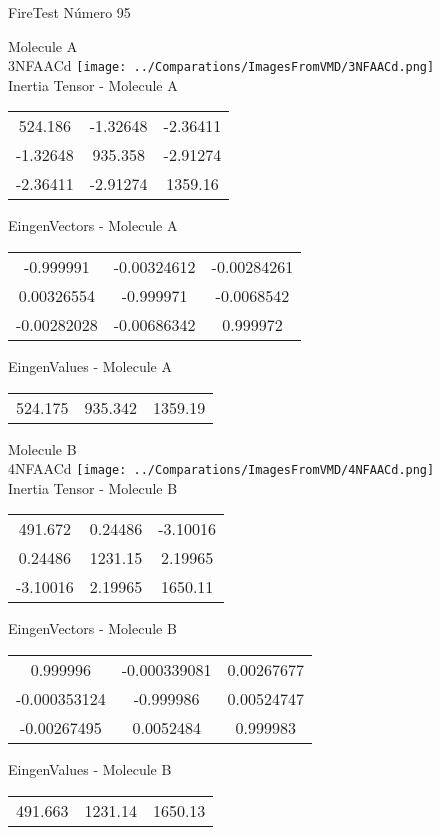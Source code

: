 \vtab[-2cm]
\begin{center}
{\large FireTest \tab Número 95}
\end{center}
\begin{multicols}{2}
\begin{center}

Molecule A \\ 
3NFAACd
\texttt{[image: ../Comparations/ImagesFromVMD/3NFAACd.png]}
\\
Inertia Tensor - Molecule A \\
\vtab

\begin{tabular}{|c c c|}
524.186	 & 	-1.32648	 & 	-2.36411	 \\
-1.32648	 & 	935.358	 & 	-2.91274	 \\
-2.36411	 & 	-2.91274	 & 	1359.16
\end{tabular}

\vtab
 EingenVectors - Molecule A     \\
\vtab
\begin{tabular}{|c c c|}
-0.999991	 & 	-0.00324612	 & 	-0.00284261	 \\
0.00326554	 & 	-0.999971	 & 	-0.0068542	 \\
-0.00282028	 & 	-0.00686342	 & 	0.999972
\end{tabular}

\vtab
 EingenValues - Molecule A     \\
\vtab
\begin{tabular}{|c c c|}
524.175	 & 	935.342	 & 	1359.19	 \\
\end{tabular}
\columnbreak

Molecule B \\ 
4NFAACd
\texttt{[image: ../Comparations/ImagesFromVMD/4NFAACd.png]}
\\
Inertia Tensor - Molecule B \\
\vtab

\begin{tabular}{|c c c|}
491.672	 & 	0.24486	 & 	-3.10016	 \\
0.24486	 & 	1231.15	 & 	2.19965	 \\
-3.10016	 & 	2.19965	 & 	1650.11
\end{tabular}

\vtab
 EingenVectors - Molecule B     \\
\vtab
\begin{tabular}{|c c c|}
0.999996	 & 	-0.000339081	 & 	0.00267677	 \\
-0.000353124	 & 	-0.999986	 & 	0.00524747	 \\
-0.00267495	 & 	0.0052484	 & 	0.999983
\end{tabular}

\vtab
 EingenValues - Molecule B     \\
\vtab
\begin{tabular}{|c c c|}
491.663	 & 	1231.14	 & 	1650.13	 \\
\end{tabular}

\end{center}
\end{multicols}
